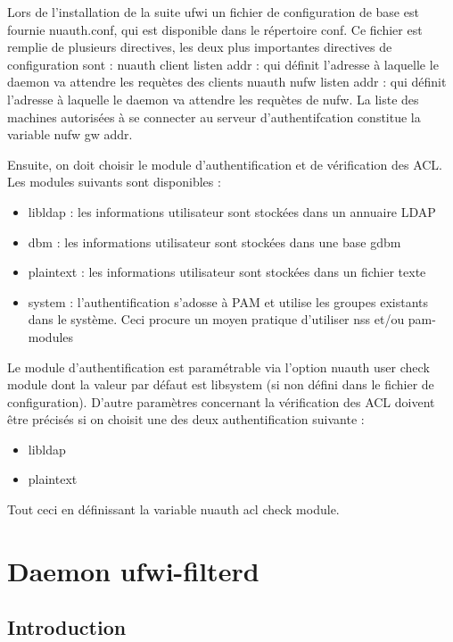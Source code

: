 \documentclass[12pt]{report}
\begin{document}
\begin{itemize}
Lors de l'installation de la suite ufwi un fichier de configuration de base est fournie nuauth.conf, qui est disponible 
dans le répertoire conf.
Ce fichier est remplie de plusieurs directives, les deux plus importantes directives de configuration sont : 
nuauth client listen addr : qui définit l’adresse à laquelle le daemon va attendre les requètes des clients 
nuauth nufw listen addr : qui définit l’adresse à laquelle le daemon va attendre les requètes de nufw. 
La liste des machines autorisées à se connecter au serveur d'authentifcation constitue la variable nufw gw addr.

Ensuite, on doit choisir le module d’authentification et de vérification des ACL. Les modules suivants sont disponibles :
\begin{itemize}
 \item libldap : les informations utilisateur sont stockées dans un annuaire LDAP
 \item dbm : les informations utilisateur sont stockées dans une base gdbm
 \item plaintext : les informations utilisateur sont stockées dans un fichier texte
 \item system : l’authentification s’adosse à PAM et utilise les groupes existants dans le système. Ceci procure un 
moyen pratique d’utiliser nss et/ou pam-modules
\end{itemize}

Le module d’authentification est paramétrable via l’option nuauth user check module dont la valeur par défaut est
libsystem (si non défini dans le fichier de configuration). D’autre paramètres concernant la vérification
des ACL doivent être précisés si on choisit une des deux authentification suivante :
\begin{itemize}
 \item libldap
 \item plaintext
\end{itemize}
Tout ceci en définissant la variable nuauth acl check module.

\chapter{Daemon ufwi-filterd}
\section{Introduction}


\end{itemize}
\end{document}
